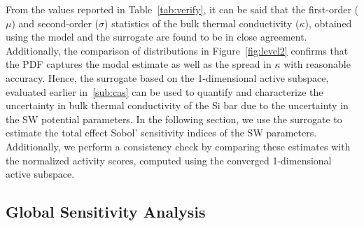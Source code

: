 %
From the values reported in Table~\ref{tab:verify}, it can be said that the
 first-order ($\mu$) and second-order ($\sigma$) statistics of the bulk thermal conductivity ($\kappa$),
obtained using the model and the surrogate  are found to be in close agreement. Additionally, the
comparison of distributions in Figure~\ref{fig:level2} confirms that the PDF captures the modal
estimate as well as the spread in $\kappa$ with reasonable accuracy. Hence, the surrogate based on
the 1-dimensional active subspace, evaluated earlier in~\ref{sub:cas} can be used to quantify and
characterize the uncertainty in bulk thermal conductivity of the Si bar due to the uncertainty in the
SW potential parameters. In the following section, we use the surrogate to estimate the 
total effect Sobol'
sensitivity indices of the SW parameters. Additionally, we perform a consistency check by comparing
these estimates with the normalized activity scores, computed using the converged 1-dimensional
active subspace. 

\subsection{Global Sensitivity Analysis}
\label{sub:gsa}

